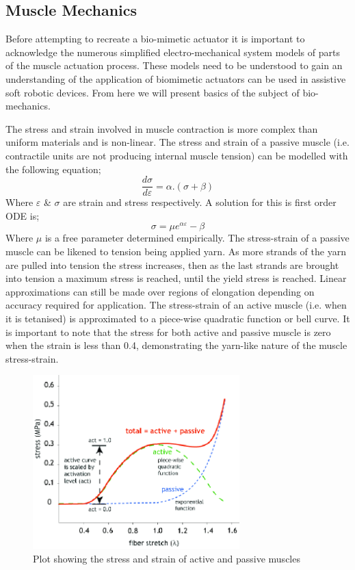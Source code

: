 \subsection{Muscle Mechanics}
Before attempting to recreate a bio-mimetic actuator it is important to acknowledge the numerous simplified electro-mechanical system models of parts of the muscle actuation process. These models need to be understood to gain an understanding of the application of biomimetic actuators can be used in assistive soft robotic devices. From here we will present basics of the subject of bio-mechanics.

The stress and strain involved in muscle contraction is more complex than uniform materials and is non-linear. The stress and strain of a passive muscle (i.e. contractile units are not producing internal muscle tension) can be modelled with the following equation; 
\begin{equation}
    \frac{d\sigma}{d\varepsilon} =  \alpha.(\sigma+\beta)
\end{equation}
Where $\varepsilon$ \& $\sigma$ are strain and stress respectively. A solution for this is first order ODE is; 
\begin{equation}
    \sigma = \mu e^{\alpha\varepsilon} - \beta
\end{equation}
Where $\mu$ is a free parameter determined empirically. The stress-strain of a passive muscle can be likened to tension being applied yarn. As more strands of the yarn are pulled into tension the stress increases, then as the last strands are brought into tension a maximum stress is reached, until the yield stress is reached. Linear approximations can still be made over regions of elongation depending on accuracy required for application. The stress-strain of an active muscle (i.e. when it is tetanised) is approximated to a piece-wise quadratic function or bell curve. It is important to note that the stress for both active and passive muscle is zero when the strain is less than 0.4, demonstrating the yarn-like nature of the muscle stress-strain.

\begin{figure}[H]
  \centering
  \includegraphics[width=8cm]{Figures/Muscle-fiber-active-and-passive-behavior.png}
  \caption{Plot showing the stress and strain of active and passive muscles \citep{Teran2003}}
  \label{fig:Muscle}
\end{figure}

